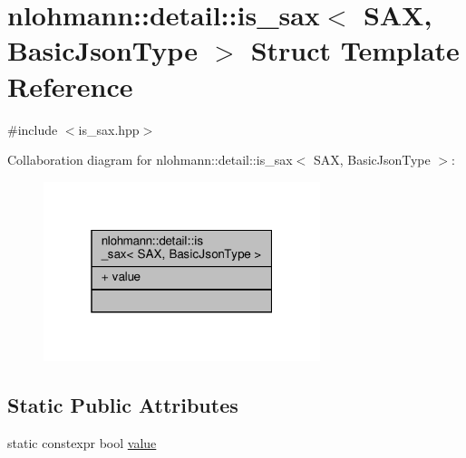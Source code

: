 \hypertarget{structnlohmann_1_1detail_1_1is__sax}{}\section{nlohmann\+:\+:detail\+:\+:is\+\_\+sax$<$ S\+AX, Basic\+Json\+Type $>$ Struct Template Reference}
\label{structnlohmann_1_1detail_1_1is__sax}


{\ttfamily \#include $<$is\+\_\+sax.\+hpp$>$}



Collaboration diagram for nlohmann\+:\+:detail\+:\+:is\+\_\+sax$<$ S\+AX, Basic\+Json\+Type $>$\+:\nopagebreak
\begin{figure}[H]
\begin{center}
\leavevmode
\includegraphics[width=229pt]{structnlohmann_1_1detail_1_1is__sax__coll__graph}
\end{center}
\end{figure}
\subsection*{Static Public Attributes}
\begin{DoxyCompactItemize}
\item 
static constexpr bool \hyperlink{structnlohmann_1_1detail_1_1is__sax_a8ab7e51087000e948b4a2492257484dc}{value}
\end{DoxyCompactItemize}
